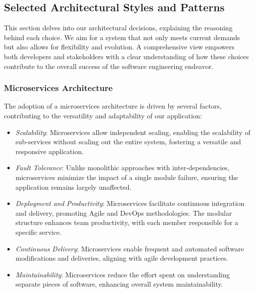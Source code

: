 \subsection{Selected Architectural Styles and Patterns}

This section delves into our architectural decisions, explaining the reasoning behind each choice. We aim for a system that not only meets current demands but also allows for flexibility and evolution. A comprehensive view empowers both developers and stakeholders with a clear understanding of how these choices contribute to the overall success of the software engineering endeavor.

\subsubsection*{Microservices Architecture}

The adoption of a microservices architecture is driven by several factors, contributing to the versatility and adaptability of our application:

\begin{itemize}
    \item \textit{Scalability}: Microservices allow independent scaling, enabling the scalability of sub-services without scaling out the entire system, fostering a versatile and responsive application.
  
    \item \textit{Fault Tolerance}: Unlike monolithic approaches with inter-dependencies, microservices minimize the impact of a single module failure, ensuring the application remains largely unaffected.
  
    \item \textit{Deployment and Productivity}: Microservices facilitate continuous integration and delivery, promoting Agile and DevOps methodologies. The modular structure enhances team productivity, with each member responsible for a specific service.
  
    \item \textit{Continuous Delivery}: Microservices enable frequent and automated software modifications and deliveries, aligning with agile development practices.
  
    \item \textit{Maintainability}: Microservices reduce the effort spent on understanding separate pieces of software, enhancing overall system maintainability.
\end{itemize}

